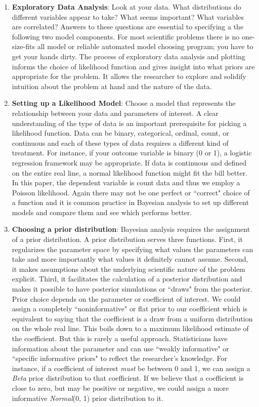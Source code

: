 \documentclass[12pt, oneside]{article}
\begin{document}
 \begin{enumerate}
 \item{\textbf{Exploratory Data Analysis}: Look at your data.  What distributions do different variables appear to take?  What seems important?  What variables are correlated?  Answers to these questions are essential to specifying a the following two model components.  For most scientific problems there is no one-size-fits all model or reliable automated model choosing program; you have to get your hands dirty. The process of exploratory data analysis and plotting informs the choice of likelihood function and gives insight into what priors are appropriate for the problem. It allows the researcher to explore and solidify intuition about the problem at hand and the nature of the data.}
 \item{\textbf{Setting up a Likelihood Model}: Choose a model that represents the relationship between your data and parameters of interest.  A clear understanding of the type of data is an important prerequisite for picking a likelihood function. Data can be binary, categorical, ordinal, count, or continuous and each of these types of data requires a different kind of treatment. For instance, if your outcome variable is binary (0 or 1), a logistic regression framework may be appropriate. If data is continuous and defined on the entire real line, a normal likelihood function might fit the bill better. In this paper, the dependent variable is count data and thus we employ a Poisson likelihood. Again there may not be one perfect or ``correct" choice of a function and it is common practice in Bayesian analysis to set up different models and compare them and see which performs better.} 
 
 \item{\textbf{Choosing a prior distribution}:  
 Bayesian analysis requires the assignment of a prior distribution. A prior distribution serves three functions. First, it regularizes the parameter space by specifying what values the parameters can take and more importantly what values it definitely cannot assume. Second, it makes assumptions about the underlying scientific nature of the problem explicit. Third, it facilitates the calculation of a posterior distribution and makes it possible to have posterior simulations or ``draws" from the posterior. \\
 Prior choice depends on the parameter or coefficient of interest.  We could assign a completely ``noninformative" or flat prior to our coefficient which is equivalent to saying that the coefficient is a draw from a uniform distribution on the whole real line. This boils down to a maximum likelihood estimate of the coefficient. But this is rarely a useful approach. Statisticians have information about the parameter and can use ``weakly informative" or ``specific informative priors" to reflect the researcher's knowledge. For instance, if a coefficient of interest \emph{must} be between 0 and 1, we can assign a \emph{Beta} prior distribution to that coefficient.  If we believe that a coefficient is close to zero, but may be positive or negative, we could assign a more informative \emph{Normal}(0, 1) prior distribution to it. } \\
 

\end{enumerate}
\end{document}
